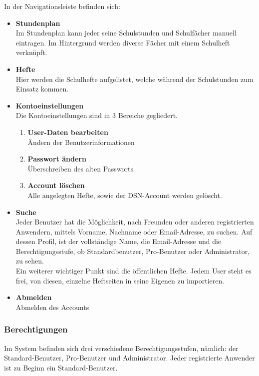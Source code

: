 In der Navigationsleiste befinden sich:
\begin{itemize}
\item \textbf{Stundenplan}\\ Im Stundenplan kann jeder seine Schulstunden und Schulfächer manuell eintragen. Im Hintergrund werden diverse Fächer mit einem Schulheft verknüpft.
\item \textbf{Hefte}\\ Hier werden die Schulhefte aufgelistet, welche während der Schulstunden zum Einsatz kommen.
\item \textbf{Kontoeinstellungen}\\ Die Kontoeinstellungen sind in 3 Bereiche gegliedert.
\begin{enumerate}
\item \textbf{User-Daten bearbeiten}\\ Ändern der Benutzerinformationen
\item \textbf{Passwort ändern}\\ Überschreiben des alten Passworts
\item \textbf{Account löschen}\\ Alle angelegten Hefte, sowie der DSN-Account werden gelöscht.
\end{enumerate}
\item \textbf{Suche}\\ Jeder Benutzer hat die Möglichkeit, nach Freunden oder anderen registrierten Anwendern, mittels Vorname, Nachname oder Email-Adresse, zu suchen. Auf dessen Profil, ist der vollständige Name, die Email-Adresse und die Berechtigungsstufe, ob Standardbenutzer, Pro-Benutzer oder Administrator, zu sehen.\\
Ein weiterer wichtiger Punkt sind die öffentlichen Hefte. Jedem User steht es frei, von diesen, einzelne Heftseiten in seine Eigenen zu importieren.
\item \textbf{Abmelden}\\ Abmelden des Accounts
\end{itemize}
\newpage 

\subsubsection{Berechtigungen}
Im System befinden sich drei verschiedene Berechtigungsstufen, nämlich: der Standard-Benutzer, Pro-Benutzer und Administrator. Jeder registrierte Anwender ist zu Beginn ein Standard-Benutzer.\\


